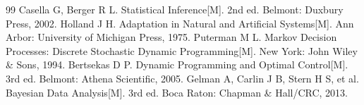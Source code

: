 \begin{thebibliography}{99}
  Casella G, Berger R L. Statistical Inference[M]. 2nd ed. Belmont: Duxbury Press, 2002.
  Holland J H. Adaptation in Natural and Artificial Systems[M]. Ann Arbor: University of Michigan Press, 1975.
  Puterman M L. Markov Decision Processes: Discrete Stochastic Dynamic Programming[M]. New York: John Wiley \& Sons, 1994.
  Bertsekas D P. Dynamic Programming and Optimal Control[M]. 3rd ed. Belmont: Athena Scientific, 2005.
  Gelman A, Carlin J B, Stern H S, et al. Bayesian Data Analysis[M]. 3rd ed. Boca Raton: Chapman \& Hall/CRC, 2013.
\end{thebibliography}
